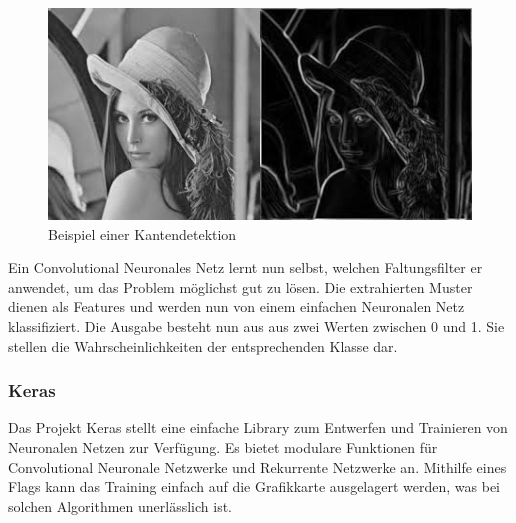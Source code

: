 \begin{figure}[H]
	\centering
	\includegraphics{images/kantendetektion.jpg}
	\caption{Beispiel einer Kantendetektion}
\end{figure}
Ein Convolutional Neuronales Netz lernt nun selbst, welchen Faltungsfilter er anwendet, um das Problem möglichst gut zu lösen. Die extrahierten Muster dienen als Features und werden nun von einem einfachen Neuronalen Netz klassifiziert. Die Ausgabe besteht nun aus aus zwei Werten zwischen 0 und 1. Sie stellen die Wahrscheinlichkeiten der entsprechenden Klasse dar.

\subsubsection{Keras}
Das Projekt \Gls{Keras} \cite{Keras} stellt eine einfache Library zum Entwerfen und Trainieren von Neuronalen Netzen zur Verfügung. Es bietet modulare Funktionen für Convolutional Neuronale Netzwerke und Rekurrente Netzwerke an. Mithilfe eines Flags kann das Training einfach auf die Grafikkarte ausgelagert werden, was bei solchen Algorithmen unerlässlich ist.
\newpage
